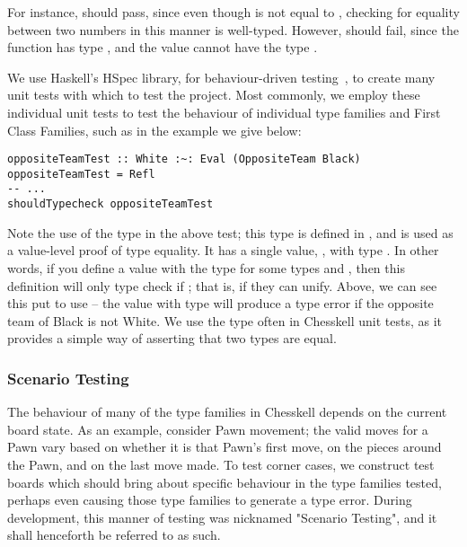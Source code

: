 For instance,  should pass, since even though  is not equal to , checking for equality between two numbers in this manner is well-typed. However,  should fail, since the function  has type , and the value  cannot have the type .

We use Haskell's HSpec library, for behaviour-driven testing~\cite{hspec}, to create many unit tests with which to test the project. Most commonly, we employ these individual unit tests to test the behaviour of individual type families and First Class Families, such as in the example we give below:

\begin{lstlisting}
oppositeTeamTest :: White :~: Eval (OppositeTeam Black)
oppositeTeamTest = Refl
-- ...
shouldTypecheck oppositeTeamTest
\end{lstlisting}

Note the use of the \inline{(:~:)} type in the above test; this type is defined in , and is used as a value-level proof of type equality. It has a single value, , with type . In other words, if you define a  value with the type  for some types  and , then this definition will only type check if ; that is, if they can unify. Above, we can see this put to use -- the  value with type  will produce a type error if the opposite team of Black is not White. We use the \inline{(:~:)} type often in Chesskell unit tests, as it provides a simple way of asserting that two types are equal.

\subsubsection{Scenario Testing} \label{scenariosection}

The behaviour of many of the type families in Chesskell depends on the current board state. As an example, consider Pawn movement; the valid moves for a Pawn vary based on whether it is that Pawn's first move, on the pieces around the Pawn, and on the last move made. To test corner cases, we construct test boards which should bring about specific behaviour in the type families tested, perhaps even causing those type families to generate a type error. During development, this manner of testing was nicknamed "Scenario Testing", and it shall henceforth be referred to as such.

